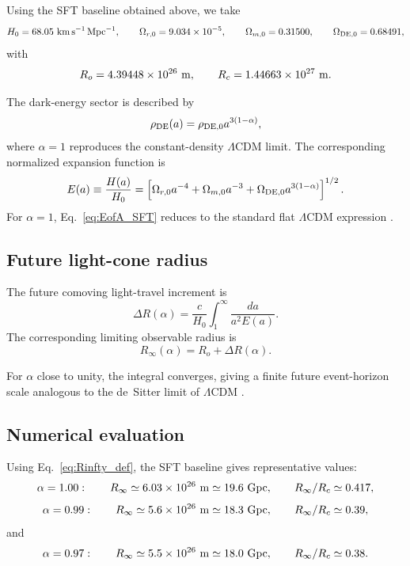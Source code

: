 \documentclass[12pt]{article}
\begin{document}
Using the SFT baseline obtained above, we take
\[
H_0 = 68.05~{\rm km\,s^{-1}\,Mpc^{-1}},\qquad
\Omega_{r,0}=9.034\times10^{-5},\qquad
\Omega_{m,0}=0.31500,\qquad
\Omega_{{\rm DE},0}=0.68491,
\]
with
\[
R_o=4.39448\times10^{26}\ {\rm m},\qquad
R_c=1.44663\times10^{27}\ {\rm m}.
\]

The dark-energy sector is described by
\begin{equation}
\rho_{\rm DE}(a)
=
\rho_{{\rm DE},0}a^{3(1-\alpha)},
\label{eq:rhoDE_SFT}
\end{equation}
where $\alpha=1$ reproduces the constant-density $\Lambda$CDM limit.
The corresponding normalized expansion function is
\begin{equation}
E(a)\equiv\frac{H(a)}{H_0}
=
\left[
\Omega_{r,0}a^{-4}
+\Omega_{m,0}a^{-3}
+\Omega_{{\rm DE},0}a^{3(1-\alpha)}
\right]^{1/2}.
\label{eq:EofA_SFT}
\end{equation}
For $\alpha=1$, Eq.~\eqref{eq:EofA_SFT} reduces to the standard flat
$\Lambda$CDM expression \cite{Carroll2001,Weinberg2008,Planck2020}.

\subsection{Future light-cone radius}

The future comoving light-travel increment is
\begin{equation}
\Delta R(\alpha)
=
\frac{c}{H_0}
\int_{1}^{\infty}\frac{da}{a^2E(a)}.
\label{eq:deltaR_future}
\end{equation}
The corresponding limiting observable radius is
\begin{equation}
R_\infty(\alpha)=R_o+\Delta R(\alpha).
\label{eq:Rinfty_def}
\end{equation}

For $\alpha$ close to unity, the integral converges, giving a finite future
event-horizon scale analogous to the de~Sitter limit of $\Lambda$CDM
\cite{Carroll2001,Ellis2007,Weinberg2008}.

\subsection{Numerical evaluation}

Using Eq.~\eqref{eq:Rinfty_def}, the SFT baseline gives representative values:
\[
\alpha=1.00:\qquad
R_\infty \simeq 6.03\times10^{26}\ {\rm m}
\simeq 19.6~{\rm Gpc},
\qquad
R_\infty/R_c\simeq0.417,
\]
\[
\alpha=0.99:\qquad
R_\infty \simeq 5.6\times10^{26}\ {\rm m}
\simeq 18.3~{\rm Gpc},
\qquad
R_\infty/R_c\simeq0.39,
\]
and
\[
\alpha=0.97:\qquad
R_\infty \simeq 5.5\times10^{26}\ {\rm m}
\simeq 18.0~{\rm Gpc},
\qquad
R_\infty/R_c\simeq0.38.
\]
\end{document}
